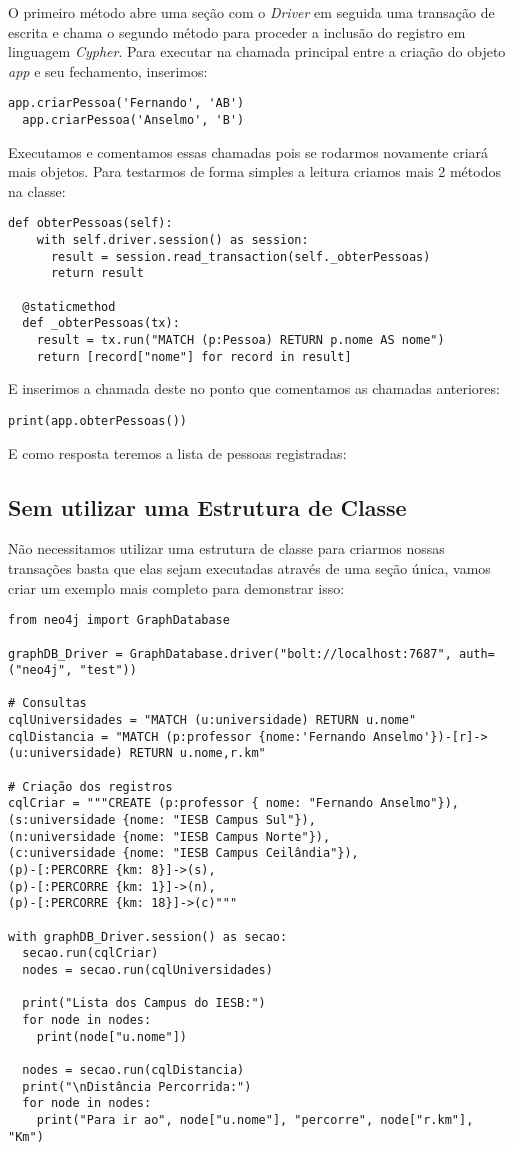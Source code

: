 O primeiro método abre uma seção com o \textit{Driver} em seguida uma transação de escrita e chama o segundo método para proceder a inclusão do registro em linguagem \textit{Cypher}. Para executar na chamada principal entre a criação do objeto \textit{app} e seu fechamento, inserimos:
\begin{lstlisting}[]
  app.criarPessoa('Fernando', 'AB')
  app.criarPessoa('Anselmo', 'B')
\end{lstlisting}	

Executamos e comentamos essas chamadas pois se rodarmos novamente criará mais objetos. Para testarmos de forma simples a leitura criamos mais 2 métodos na classe:
\begin{lstlisting}[]
  def obterPessoas(self):
    with self.driver.session() as session:
      result = session.read_transaction(self._obterPessoas)
      return result

  @staticmethod
  def _obterPessoas(tx):
    result = tx.run("MATCH (p:Pessoa) RETURN p.nome AS nome")
    return [record["nome"] for record in result]
\end{lstlisting}	

E inserimos a chamada deste no ponto que comentamos as chamadas anteriores:
\begin{lstlisting}[]
  print(app.obterPessoas())	
\end{lstlisting}	

E como resposta teremos a lista de pessoas registradas: \\

\subsection{Sem utilizar uma Estrutura de Classe}
Não necessitamos utilizar uma estrutura de classe para criarmos nossas transações basta que elas sejam executadas através de uma seção única, vamos criar um exemplo mais completo para demonstrar isso:
\begin{lstlisting}[]
from neo4j import GraphDatabase

graphDB_Driver = GraphDatabase.driver("bolt://localhost:7687", auth=("neo4j", "test"))

# Consultas
cqlUniversidades = "MATCH (u:universidade) RETURN u.nome"
cqlDistancia = "MATCH (p:professor {nome:'Fernando Anselmo'})-[r]->(u:universidade) RETURN u.nome,r.km"

# Criação dos registros
cqlCriar = """CREATE (p:professor { nome: "Fernando Anselmo"}),
(s:universidade {nome: "IESB Campus Sul"}),
(n:universidade {nome: "IESB Campus Norte"}),
(c:universidade {nome: "IESB Campus Ceilândia"}),
(p)-[:PERCORRE {km: 8}]->(s),
(p)-[:PERCORRE {km: 1}]->(n),
(p)-[:PERCORRE {km: 18}]->(c)"""

with graphDB_Driver.session() as secao:
  secao.run(cqlCriar)
  nodes = secao.run(cqlUniversidades)

  print("Lista dos Campus do IESB:")
  for node in nodes:
    print(node["u.nome"])

  nodes = secao.run(cqlDistancia)
  print("\nDistância Percorrida:")
  for node in nodes:
    print("Para ir ao", node["u.nome"], "percorre", node["r.km"], "Km")
\end{lstlisting}	

